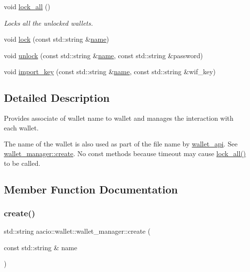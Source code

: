 \begin{DoxyCompactItemize}
void \mbox{\hyperlink{classaacio_1_1wallet_1_1wallet__manager_a9a428038f33268fddfd05b831fee3170}{lock\+\_\+all}} ()
\begin{DoxyCompactList}\small\item\em Locks all the unlocked wallets. \end{DoxyCompactList}\item 
void \mbox{\hyperlink{classaacio_1_1wallet_1_1wallet__manager_aa42127c86142365f2bd51dc1232db9c8}{lock}} (const std\+::string \&\mbox{\hyperlink{structaacio_1_1name}{name}})
\item 
void \mbox{\hyperlink{classaacio_1_1wallet_1_1wallet__manager_a9ba50fc7c2965c28ccbdeaf82bf818e1}{unlock}} (const std\+::string \&\mbox{\hyperlink{structaacio_1_1name}{name}}, const std\+::string \&password)
\item 
void \mbox{\hyperlink{classaacio_1_1wallet_1_1wallet__manager_abd33e1ad084b2ba18398848f99ab62fe}{import\+\_\+key}} (const std\+::string \&\mbox{\hyperlink{structaacio_1_1name}{name}}, const std\+::string \&wif\+\_\+key)
\end{DoxyCompactItemize}


\subsection{Detailed Description}
Provides associate of wallet name to wallet and manages the interaction with each wallet.

The name of the wallet is also used as part of the file name by \mbox{\hyperlink{classaacio_1_1wallet_1_1wallet__api}{wallet\+\_\+api}}. See \mbox{\hyperlink{classaacio_1_1wallet_1_1wallet__manager_a3f00a9c85f0bbef53137253bc020e467}{wallet\+\_\+manager\+::create}}. No const methods because timeout may cause \mbox{\hyperlink{classaacio_1_1wallet_1_1wallet__manager_a9a428038f33268fddfd05b831fee3170}{lock\+\_\+all()}} to be called. 

\subsection{Member Function Documentation}
\mbox{\label{classaacio_1_1wallet_1_1wallet__manager_a3f00a9c85f0bbef53137253bc020e467}} 
\subsubsection{\texorpdfstring{create()}{create()}}
{\footnotesize\ttfamily std\+::string aacio\+::wallet\+::wallet\+\_\+manager\+::create (\begin{DoxyParamCaption}\item[{const std\+::string \&}]{name }\end{DoxyParamCaption})}

